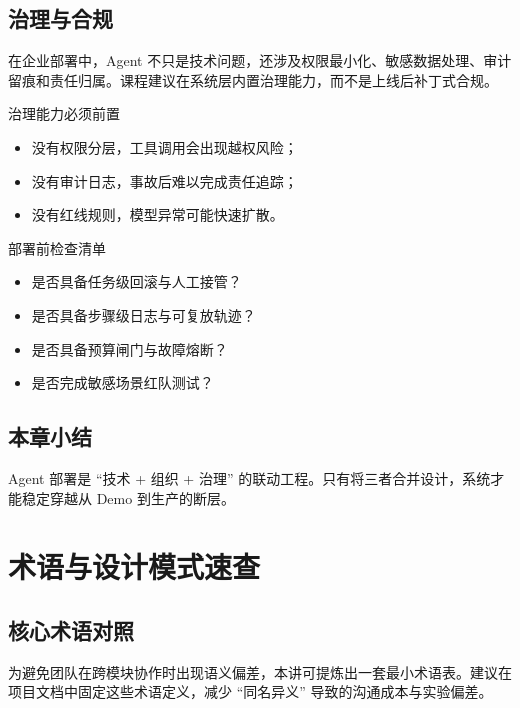 \documentclass[a4paper]{article}
\begin{document}
\subsection{治理与合规}
在企业部署中，Agent 不只是技术问题，还涉及权限最小化、敏感数据处理、审计留痕和责任归属。课程建议在系统层内置治理能力，而不是上线后补丁式合规。

\begin{warningbox}{治理能力必须前置}
\begin{itemize}
    \item 没有权限分层，工具调用会出现越权风险；
    \item 没有审计日志，事故后难以完成责任追踪；
    \item 没有红线规则，模型异常可能快速扩散。
\end{itemize}
\end{warningbox}

\begin{knowledgebox}{部署前检查清单}
\begin{itemize}
    \item 是否具备任务级回滚与人工接管？
    \item 是否具备步骤级日志与可复放轨迹？
    \item 是否具备预算闸门与故障熔断？
    \item 是否完成敏感场景红队测试？
\end{itemize}
\end{knowledgebox}

\subsection{本章小结}
Agent 部署是 ``技术 + 组织 + 治理'' 的联动工程。只有将三者合并设计，系统才能稳定穿越从 Demo 到生产的断层。

\section{术语与设计模式速查}

\subsection{核心术语对照}
为避免团队在跨模块协作时出现语义偏差，本讲可提炼出一套最小术语表。建议在项目文档中固定这些术语定义，减少 ``同名异义'' 导致的沟通成本与实验偏差。
\end{document}
